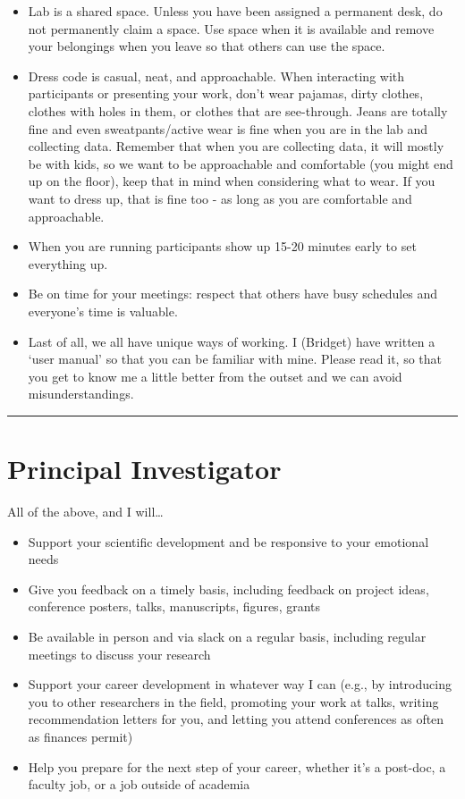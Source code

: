 \documentclass[
]{book}
\providecommand{\tightlist}{%
  \setlength{\itemsep}{0pt}\setlength{\parskip}{0pt}}
\begin{document}
\begin{itemize}
\item
  Lab is a shared space. Unless you have been assigned a permanent desk, do not permanently claim a space. Use space when it is available and remove your belongings when you leave so that others can use the space.
\item
  Dress code is casual, neat, and approachable. When interacting with participants or presenting your work, don't wear pajamas, dirty clothes, clothes with holes in them, or clothes that are see-through. Jeans are totally fine and even sweatpants/active wear is fine when you are in the lab and collecting data. Remember that when you are collecting data, it will mostly be with kids, so we want to be approachable and comfortable (you might end up on the floor), keep that in mind when considering what to wear. If you want to dress up, that is fine too - as long as you are comfortable and approachable.
\item
  When you are running participants show up 15-20 minutes early to set everything up.
\item
  Be on time for your meetings: respect that others have busy schedules and everyone's time is valuable.
\item
  Last of all, we all have unique ways of working. I (Bridget) have written a `user manual' so that you can be familiar with mine. Please read it, so that you get to know me a little better from the outset and we can avoid misunderstandings.
\end{itemize}

\begin{center}\rule{0.5\linewidth}{0.5pt}\end{center}

\hypertarget{principal-investigator}{%
\section{Principal Investigator}\label{principal-investigator}}

All of the above, and I will\ldots{}

\begin{itemize}
\tightlist
\item
  Support your scientific development and be responsive to your emotional needs
\item
  Give you feedback on a timely basis, including feedback on project ideas, conference posters, talks, manuscripts, figures, grants
\item
  Be available in person and via slack on a regular basis, including regular meetings to discuss your research
\item
  Support your career development in whatever way I can (e.g., by introducing you to other researchers in the field, promoting your work at talks, writing recommendation letters for you, and letting you attend conferences as often as finances permit)
\item
  Help you prepare for the next step of your career, whether it's a post-doc, a faculty job, or a job outside of academia
\end{itemize}
\end{document}
